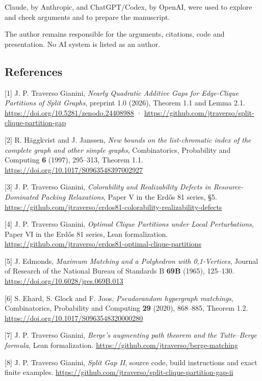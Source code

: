 \documentclass[english,11pt,a4paper]{article}
\begin{document}
Claude, by Anthropic, and ChatGPT/Codex, by OpenAI, were used to explore and check arguments and to prepare the manuscript.

The author remains responsible for the arguments, citations, code and presentation. No AI system is listed as an author.

\subsection{References}\label{references}

{[}1{]} J. P. Traverso Gianini, \emph{Nearly Quadratic Additive Gaps for Edge-Clique Partitions of Split Graphs}, preprint 1.0 (2026), Theorem 1.1 and Lemma 2.1. \url{https://doi.org/10.5281/zenodo.24408988} · \url{https://github.com/jtraverso/split-clique-partition-gap}

{[}2{]} R. Häggkvist and J. Janssen, \emph{New bounds on the list-chromatic index of the complete graph and other simple graphs}, Combinatorics, Probability and Computing \textbf{6} (1997), 295--313, Theorem 1.1. \url{https://doi.org/10.1017/S0963548397002927}

{[}3{]} J. P. Traverso Gianini, \emph{Colorability and Realizability Defects in Resource-Dominated Packing Relaxations}, Paper V in the Erdős 81 series, §5. \url{https://github.com/jtraverso/erdos81-colorability-realizability-defects}

{[}4{]} J. P. Traverso Gianini, \emph{Optimal Clique Partitions under Local Perturbations}, Paper VI in the Erdős 81 series, Lean formalization. \url{https://github.com/jtraverso/erdos81-optimal-clique-partitions}

{[}5{]} J. Edmonds, \emph{Maximum Matching and a Polyhedron with 0,1-Vertices}, Journal of Research of the National Bureau of Standards B \textbf{69B} (1965), 125--130. \url{https://doi.org/10.6028/jres.069B.013}

{[}6{]} S. Ehard, S. Glock and F. Joos, \emph{Pseudorandom hypergraph matchings}, Combinatorics, Probability and Computing \textbf{29} (2020), 868--885, Theorem 1.2. \url{https://doi.org/10.1017/S0963548320000280}

{[}7{]} J. P. Traverso Gianini, \emph{Berge's augmenting path theorem and the Tutte--Berge formula}, Lean formalization. \url{https://github.com/jtraverso/berge-matching}

{[}8{]} J. P. Traverso Gianini, \emph{Split Gap II}, source code, build instructions and exact finite examples. \url{https://github.com/jtraverso/split-clique-partition-gap-ii}
\end{document}
